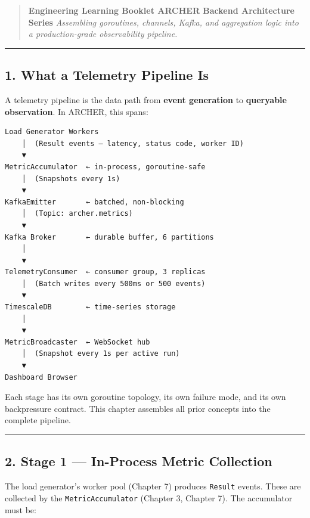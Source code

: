 \documentclass[
]{article}
\begin{document}
\begin{quote}
\textbf{Engineering Learning Booklet \textbar{} ARCHER Backend
Architecture Series} \emph{Assembling goroutines, channels, Kafka, and
aggregation logic into a production-grade observability pipeline.}
\end{quote}

\begin{center}\rule{0.5\linewidth}{0.5pt}\end{center}

\hypertarget{what-a-telemetry-pipeline-is}{%
\subsection{1. What a Telemetry Pipeline
Is}\label{what-a-telemetry-pipeline-is}}

A telemetry pipeline is the data path from \textbf{event generation} to
\textbf{queryable observation}. In ARCHER, this spans:

\begin{verbatim}
Load Generator Workers
    │  (Result events — latency, status code, worker ID)
    ▼
MetricAccumulator  ← in-process, goroutine-safe
    │  (Snapshots every 1s)
    ▼
KafkaEmitter       ← batched, non-blocking
    │  (Topic: archer.metrics)
    ▼
Kafka Broker       ← durable buffer, 6 partitions
    │
    ▼
TelemetryConsumer  ← consumer group, 3 replicas
    │  (Batch writes every 500ms or 500 events)
    ▼
TimescaleDB        ← time-series storage
    │
    ▼
MetricBroadcaster  ← WebSocket hub
    │  (Snapshot every 1s per active run)
    ▼
Dashboard Browser
\end{verbatim}

Each stage has its own goroutine topology, its own failure mode, and its
own backpressure contract. This chapter assembles all prior concepts
into the complete pipeline.

\begin{center}\rule{0.5\linewidth}{0.5pt}\end{center}

\hypertarget{stage-1-in-process-metric-collection}{%
\subsection{2. Stage 1 --- In-Process Metric
Collection}\label{stage-1-in-process-metric-collection}}

The load generator's worker pool (Chapter 7) produces \texttt{Result}
events. These are collected by the \texttt{MetricAccumulator} (Chapter
3, Chapter 7). The accumulator must be:
\end{document}

